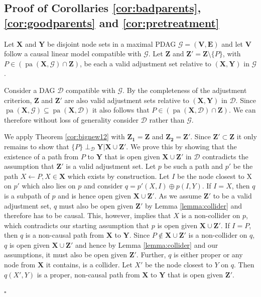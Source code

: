 \documentclass[11pt,a4paper]{article}
\theoremstyle{definition}
\theoremstyle{remark}
\newenvironment{proofof}[1][]{\begin{trivlist}
\item[\hskip \labelsep {\textit{Proof of #1.}}]}{\hfill{}$\square$\end{trivlist}}
\DeclareMathOperator{\pa}{pa}
\newcommand{\mpdag}{maximal PDAG}
\newcommand{\g}[1][G]{\mathcal{#1}}
\begin{document}
\subsection{Proof of Corollaries \ref{cor:badparents}, \ref{cor:goodparents} and \ref{cor:pretreatment}}

\begin{proofof}[Corollary \ref{cor:badparents}]
Let $\mathbf{X}$ and $\mathbf{Y}$ be disjoint node sets in a \mpdag{} $\g = (\mathbf{V},\mathbf{E})$ and let $\mathbf{V}$ follow a causal linear model compatible with $\g$. Let $\mathbf{Z}$ and $\mathbf{Z'} = \mathbf{Z} \setminus \{P\}$, with $P \in (\pa(\mathbf{X},\g) \cap \mathbf{Z})$, be each a valid adjustment set relative to $(\mathbf{X},\mathbf{Y})$ in $\g$.

Consider a DAG $\g[D]$ compatible with $\g$. By the completeness of the adjustment criterion, $\mathbf{Z}$ and $\mathbf{Z'}$ are also valid adjustment sets relative to $(\mathbf{X},\mathbf{Y})$ in $\g[D]$. Since $\pa(\mathbf{X},\g) \subseteq \pa(\mathbf{X},\g[D])$ it also follows that $P \in (\pa(\mathbf{X},\g[D]) \cap \mathbf{Z})$. We can therefore without loss of generality consider $\g[D]$ rather than $\g$.
	
We apply Theorem \ref{cor:bignew12} with $\mathbf{Z_1} = \mathbf{Z}$ and $\mathbf{Z_2} = \mathbf{Z'}$. Since $\mathbf{Z'} \subset \mathbf{Z}$ it only remains to show that $\{P\} \perp_{\g[D]} \mathbf{Y} | \mathbf{X} \cup \mathbf{Z'}$. We prove this by showing that the existence of a path from $P$ to $\mathbf{Y}$ that is open given $\mathbf{X} \cup \mathbf{Z'}$ in $\g[D]$ contradicts the assumption that $\mathbf{Z'}$  is a valid adjustment set. 
Let $p$ be such a path and $p'$ be the path $X \leftarrow P, X\in\mathbf{X}$ which exists by construction. Let $I$ be the node closest to X on $p'$ which also lies on $p$ and consider $q = p'(X,I) \oplus p(I,Y)$. If $I=X$, then $q$ is a subpath of $p$ and is hence open given $\mathbf{X}\cup \mathbf{Z'}$. As we assume $\mathbf{Z'}$ to be a valid adjustment set, $q$ must also be open given $\mathbf{Z'}$ by Lemma \ref{lemma:collider} and therefore has to be causal. This, however, implies that $X$ is a non-collider on $p$, which contradicts our starting assumption that $p$ is open given $\mathbf{X}\cup \mathbf{Z'}$. If $I=P$, then $q$ is a non-causal path from $\mathbf{X}$ to $\mathbf{Y}$. Since $P \notin \mathbf{X} \cup \mathbf{Z'}$ is a non-collider on $q$, $q$ is open given $\mathbf{X} \cup \mathbf{Z'}$ and hence by Lemma \ref{lemma:collider} and our assumptions, it must also be open given $\mathbf{Z'}$. Further, $q$ is either proper or any node from $\mathbf{X}$ it contains, is a collider. Let $X'$ be the node closest to $Y$ on $q$. Then $q(X',Y)$ is a proper, non-causal path from $\mathbf{X}$ to $\mathbf{Y}$ that is open given $\mathbf{Z'}$.

\end{proofof}
\end{document}
